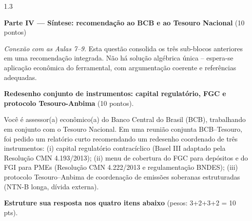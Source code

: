 \documentclass[11pt,addpoints]{exam}
\begin{document}
\begin{spacing}{1.3}
\newpage

\begin{center}\large\textbf{Parte IV --- Síntese: recomendação ao BCB e ao Tesouro Nacional} \quad (10 pontos)\end{center}

\textit{Conexão com as Aulas 7--9.} Esta questão consolida os três sub-blocos anteriores em uma recomendação integrada. Não há solução algébrica única -- espera-se aplicação econômica do ferramental, com argumentação coerente e referências adequadas.

\begin{questions}
\setcounter{question}{3}
\question \textbf{Redesenho conjunto de instrumentos: capital regulatório, FGC e protocolo Tesouro-Anbima} (10 pontos).

Você é assessor(a) econômico(a) do Banco Central do Brasil (BCB), trabalhando em conjunto com o Tesouro Nacional. Em uma reunião conjunta BCB--Tesouro, foi pedido um relatório curto recomendando um redesenho coordenado de três instrumentos: (i) capital regulatório contracíclico (Basel III adaptado pela Resolução CMN 4.193/2013); (ii) menu de cobertura do FGC para depósitos e do FGI para PMEs (Resolução CMN 4.222/2013 e regulamentação BNDES); (iii) protocolo Tesouro--Anbima de coordenação de emissões soberanas estruturadas (NTN-B longa, dívida externa).

\textbf{Estruture sua resposta nos quatro itens abaixo} (pesos: 3+2+3+2 = 10 pts).

\end{questions}
\end{spacing}
\end{document}
